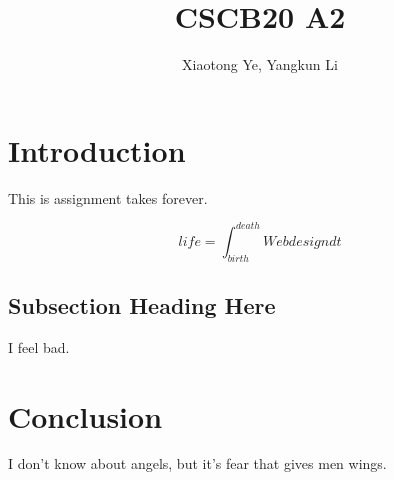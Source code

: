 \documentclass{article}
\begin{document}
\title{CSCB20 A2}
\author{Xiaotong Ye, Yangkun Li}

\maketitle

\section{Introduction}
This is assignment takes forever.

\begin{equation}
    \label{simple_equation}
    life = \int_{birth}^{death}{Web design dt}
\end{equation}

\subsection{Subsection Heading Here}
I feel bad.

\section{Conclusion}
I don't know about angels, but it's fear that gives men wings.
\end{document}
